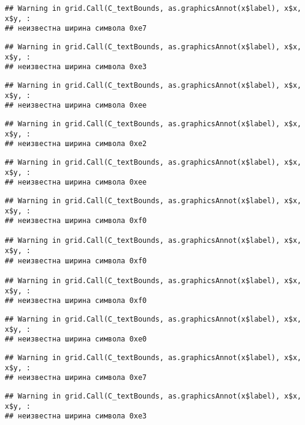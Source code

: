 \documentclass[
]{article}
\begin{document}
\begin{verbatim}
## Warning in grid.Call(C_textBounds, as.graphicsAnnot(x$label), x$x, x$y, :
## неизвестна ширина символа 0xe7
\end{verbatim}

\begin{verbatim}
## Warning in grid.Call(C_textBounds, as.graphicsAnnot(x$label), x$x, x$y, :
## неизвестна ширина символа 0xe3
\end{verbatim}

\begin{verbatim}
## Warning in grid.Call(C_textBounds, as.graphicsAnnot(x$label), x$x, x$y, :
## неизвестна ширина символа 0xee
\end{verbatim}

\begin{verbatim}
## Warning in grid.Call(C_textBounds, as.graphicsAnnot(x$label), x$x, x$y, :
## неизвестна ширина символа 0xe2
\end{verbatim}

\begin{verbatim}
## Warning in grid.Call(C_textBounds, as.graphicsAnnot(x$label), x$x, x$y, :
## неизвестна ширина символа 0xee
\end{verbatim}

\begin{verbatim}
## Warning in grid.Call(C_textBounds, as.graphicsAnnot(x$label), x$x, x$y, :
## неизвестна ширина символа 0xf0

## Warning in grid.Call(C_textBounds, as.graphicsAnnot(x$label), x$x, x$y, :
## неизвестна ширина символа 0xf0

## Warning in grid.Call(C_textBounds, as.graphicsAnnot(x$label), x$x, x$y, :
## неизвестна ширина символа 0xf0
\end{verbatim}

\begin{verbatim}
## Warning in grid.Call(C_textBounds, as.graphicsAnnot(x$label), x$x, x$y, :
## неизвестна ширина символа 0xe0
\end{verbatim}

\begin{verbatim}
## Warning in grid.Call(C_textBounds, as.graphicsAnnot(x$label), x$x, x$y, :
## неизвестна ширина символа 0xe7
\end{verbatim}

\begin{verbatim}
## Warning in grid.Call(C_textBounds, as.graphicsAnnot(x$label), x$x, x$y, :
## неизвестна ширина символа 0xe3
\end{verbatim}
\end{document}
